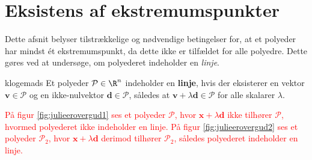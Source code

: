\section{Eksistens af ekstremumspunkter}
%
Dette afsnit belyser tilstrækkelige og nødvendige betingelser for, at et polyeder har mindst ét ekstremumspunkt, da dette ikke er tilfældet for alle polyedre. 
Dette gøres ved at undersøge, om polyederet indeholder en \textit{linje}.
%
\begin{defn}{}{klogemads}
Et polyeder $\mathcal{P} \in \R^n$ indeholder en \textbf{linje}, hvis der eksisterer en vektor $\textbf{v} \in \mathcal{P}$ og en ikke-nulvektor $\textbf{d} \in \mathcal{P}$, således at $\textbf{v} + \lambda \textbf{d} \in \mathcal{P}$ for alle skalarer $\lambda$.
\end{defn}
\noindent
%
\textcolor{red}{
På figur \ref{fig:julieerovergud1} ses et polyeder $\mathcal{P}$, hvor $\mathbf{x} + \lambda \mathbf{d}$ ikke tilhører $\mathcal{P}$, hvormed polyederet ikke indeholder en linje. 
På figur \ref{fig:julieerovergud2} ses et polyeder $\mathcal{P}_2$, hvor $\mathbf{x} + \lambda \mathbf{d}$ derimod tilhører $\mathcal{P}_2$, således polyederet indeholder en linje.
}
\\\\
